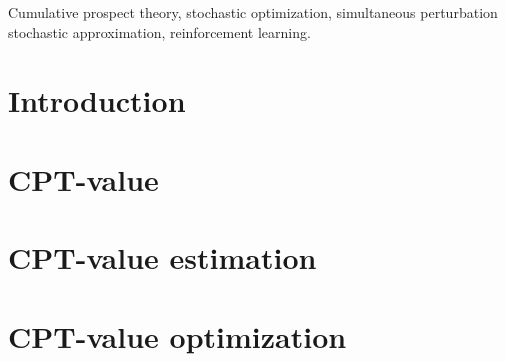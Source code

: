 \documentclass[twocolumn]{IEEEtran}
\begin{document}
\begin{IEEEkeywords}
Cumulative prospect theory, stochastic optimization, simultaneous perturbation stochastic approximation, reinforcement learning.
\end{IEEEkeywords}

\section{Introduction}
\label{sec:introduction}



\section{CPT-value}
\label{sec:cpt-val}




\section{CPT-value estimation} 
\label{sec:cpt-sampling}



\section{CPT-value optimization}
\label{sec:cpt-control}



\end{document}
